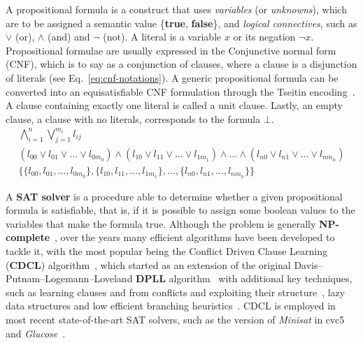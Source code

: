 \documentclass[runningheads]{llncs}
\begin{document}
A propositional formula is a construct that uses \textit{variables} (or \textit{unknowns}), which are to be assigned a semantic value \{\textbf{true}, \textbf{false}\}, and \textit{logical connectives}, such as $\lor$ (or), $\land$ (and) and $\neg$ (not).
A literal is a variable $x$ or its negation $\neg x$.
Propositional formulae are usually expressed in the Conjunctive normal form (CNF), which is to say as a conjunction of clauses, where a clause is a disjunction of literals (see Eq.~\ref{eq:cnf-notations}).
A generic propositional formula can be converted into an equisatisfiable CNF formulation through the Tseitin encoding~\cite{ref:handbook-sat}.
A clause containing exactly one literal is called a unit clause.
Lastly, an empty clause, a clause with no literals, corresponds to the formula $\bot$.
\begin{equation}
    \label{eq:cnf-notations}
    \begin{gathered}
        \bigwedge_{i=1}^n \bigvee_{j=1}^{m_i} l_{ij} \\
        ( l_{00} \lor l_{01} \lor \dots \lor l_{0m_0}) \land (l_{10} \lor l_{11} \lor \dots \lor l_{1m_1}) \land \dots \land (l_{n0} \lor l_{n1} \lor \dots \lor l_{nm_n}) \\
        \{ \{ l_{00}, l_{01} , \dots , l_{0m_0} \} , \{ l_{10} , l_{11} , \dots , l_{1m_1} \}, \dots , \{ l_{n0} , l_{n1} , \dots , l_{nm_n} \} \}
    \end{gathered}
\end{equation}

A \textbf{SAT solver} is a procedure able to determine whether a given propositional formula is satisfiable, that is, if it is possible to assign some boolean values to the variables that make the formula true.
Although the problem is generally \textbf{NP-complete}~\cite{ref:np-sat}, over the years many efficient algorithms have been developed to tackle it, with the most popular being the Conflict Driven Clause Learning (\textbf{CDCL}) algorithm~\cite{ref:handbook-sat}, which started as an extension of the original Davis–Putnam–Logemann–Loveland \textbf{DPLL} algorithm~\cite{ref:dpll} with additional key techniques, such as learning clauses and from conflicts and exploiting their structure~\cite{ref:conflict-driven-clause-learning}, lazy data structures and low efficient branching heuristics~\cite{ref:watched-literals}.
CDCL is employed in most recent state-of-the-art SAT solvers, such as the version of \textit{Minisat} in cvc5~\cite{ref:cvc5-smt-comp-2022} and \textit{Glucose}~\cite{ref:glucose}.
\end{document}

